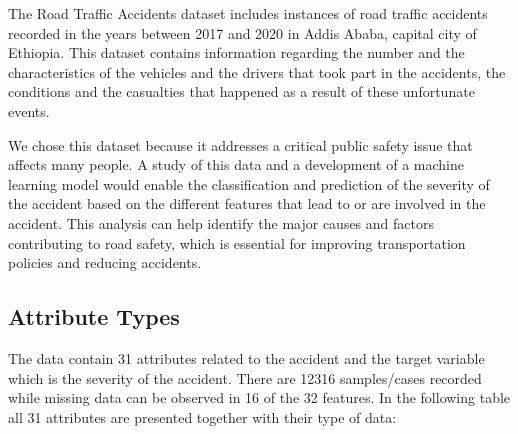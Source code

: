 \documentclass{article}
\begin{document}
The Road Traffic Accidents dataset includes instances of road traffic accidents recorded in the years between 2017 and 2020 in Addis Ababa, capital city of Ethiopia. This dataset contains information regarding the number and the characteristics of the vehicles and the drivers that took part in the accidents, the conditions and the casualties that happened as a result of these unfortunate events.\newline

We chose this dataset because it addresses a critical public safety issue that affects many people. A study of this data and a development of a machine learning model would enable the classification and prediction of the severity of the accident based on the different features that lead to or are involved in the accident. This analysis can help identify the major causes and factors contributing to road safety, which is essential for improving transportation policies and reducing accidents. 

\subsection{Attribute Types}

The data contain 31 attributes related to the accident and the target variable which is the severity of the accident. There are 12316 samples/cases recorded while missing data can be observed in 16 of the 32 features.  In the following table all 31 attributes are presented together with their type of data:
\end{document}
